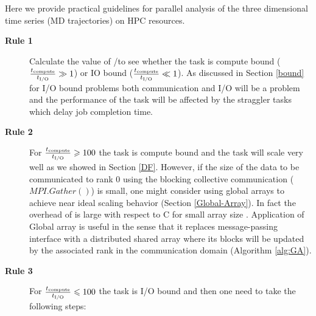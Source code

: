 \label{guideline}
Here we provide practical guidelines for parallel analysis of the three dimensional time series (MD trajectories) on HPC resources.

\begin{description}
  \item[\textbf{Rule 1}] Calculate the value of \tcomp/\tIO to see whether the task is compute bound ($\frac{{t}_{\text{compute}}}{{t}_{\text{I/O}}} \gg 1$) or IO bound ($\frac{{t}_{\text{compute}}}{{t}_{\text{I/O}}} \ll 1$). As discussed in Section \ref{bound} for I/O bound problems both communication and I/O will be a problem and the performance of the task will be affected by the straggler tasks which delay job completion time.  
  
  \item[\textbf{Rule 2}] For $\frac{{t}_{\text{compute}}}{{t}_{\text{I/O}}} \geqslant 100$ the task is compute bound and the task will scale very well as we showed in Section \ref{DF}. However, if the size of the data to be communicated to rank 0 using the blocking collective communication ($MPI.Gather()$) is small, one might consider using global arrays to achieve near ideal scaling behavior (Section \ref{Global-Array}). In fact the overhead of  is large with respect to C for small array size \cite{Dalcin:2011aa}. Application of Global array is useful in the sense that it replaces message-passing interface with a distributed shared array where its blocks will be updated by the associated rank in the communication domain (Algorithm \ref{alg:GA}). 
  \item[\textbf{Rule 3}] For $\frac{{t}_{\text{compute}}}{{t}_{\text{I/O}}} \leqslant 100$ the task is I/O bound and then one need to take the following steps:
   

\end{description}
